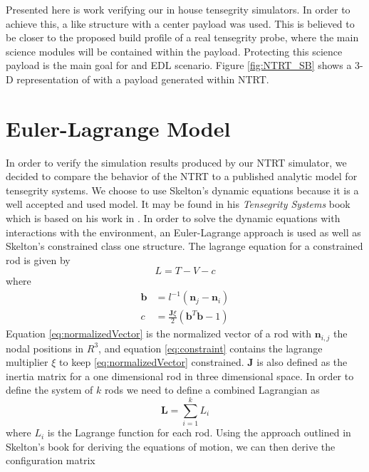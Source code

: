 Presented here is work verifying our in house tensegrity simulators.
In order to achieve this, a \SB{} like structure with a center payload was used.
This is believed to be closer to the proposed build profile of a real tensegrity probe, where the main science modules will be contained within the payload.
Protecting this science payload is the main goal for and EDL scenario.
Figure \ref{fig:NTRT_SB} shows a 3-D representation of \SB{} with a payload generated within NTRT.

\section{Euler-Lagrange Model}
In order to verify the simulation results produced by our NTRT simulator, we decided to compare the behavior of the NTRT to a published analytic model for tensegrity systems.
We choose to use Skelton's dynamic equations because it is a well accepted and used model.
It may be found in his \emph{Tensegrity Systems} book \cite{skelton_tensegrity_2009} which is based on his work in \cite{skelton2005dynamics}.
In order to solve the dynamic equations with interactions with the environment, an Euler-Lagrange approach is used as well as Skelton's constrained class one structure.
The lagrange equation for a constrained rod is given by
\begin{equation}
\label{eq:lagrange}
L = T - V - c
\end{equation}
where
\begin{align}
\mathbf{b} &= l^{-1}(\mathbf{n}_{j}-\mathbf{n}_{i})\label{eq:normalizedVector}\\
c &= \frac{\mathbf{J}\xi}{2}(\mathbf{b}^{T}\mathbf{b}-1)\label{eq:constraint}
\end{align} 
Equation \eqref{eq:normalizedVector} is the normalized vector of a rod with \(\mathbf{n}_{i,j}\) the nodal positions in \(R^3\), and equation \eqref{eq:constraint} contains the lagrange multiplier \(\xi\) to keep \eqref{eq:normalizedVector} constrained.
\(\mathbf{J}\) is also defined as the inertia matrix for a one dimensional rod in three dimensional space.
In order to define the system of \(k\) rods we need to define a combined Lagrangian as
\begin{equation}
\mathbf{L} = \sum_{i=1}^{k} L_{i}\label{eq:combinedLagrangian}
\end{equation}
where \(L_{i}\) is the Lagrange function for each rod.
Using the approach outlined in Skelton's book for deriving the equations of motion, we can then derive the configuration matrix
